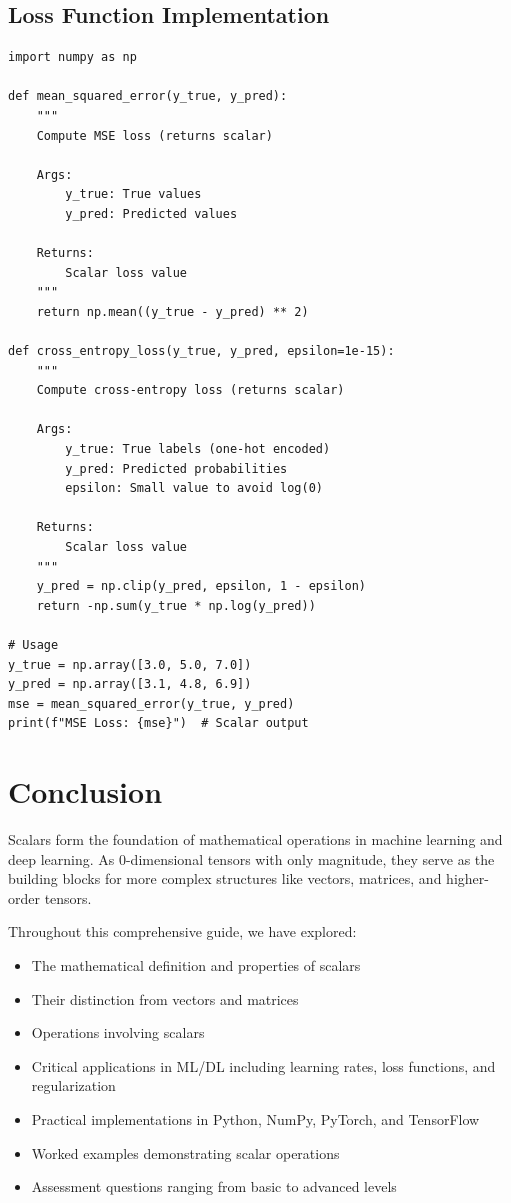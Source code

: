 \documentclass[11pt,a4paper]{article}
\begin{document}
\subsection{Loss Function Implementation}

\begin{lstlisting}
import numpy as np

def mean_squared_error(y_true, y_pred):
    """
    Compute MSE loss (returns scalar)
    
    Args:
        y_true: True values
        y_pred: Predicted values
    
    Returns:
        Scalar loss value
    """
    return np.mean((y_true - y_pred) ** 2)

def cross_entropy_loss(y_true, y_pred, epsilon=1e-15):
    """
    Compute cross-entropy loss (returns scalar)
    
    Args:
        y_true: True labels (one-hot encoded)
        y_pred: Predicted probabilities
        epsilon: Small value to avoid log(0)
    
    Returns:
        Scalar loss value
    """
    y_pred = np.clip(y_pred, epsilon, 1 - epsilon)
    return -np.sum(y_true * np.log(y_pred))

# Usage
y_true = np.array([3.0, 5.0, 7.0])
y_pred = np.array([3.1, 4.8, 6.9])
mse = mean_squared_error(y_true, y_pred)
print(f"MSE Loss: {mse}")  # Scalar output
\end{lstlisting}

\section{Conclusion}

Scalars form the foundation of mathematical operations in machine learning and deep learning. As 0-dimensional tensors with only magnitude, they serve as the building blocks for more complex structures like vectors, matrices, and higher-order tensors.

Throughout this comprehensive guide, we have explored:
\begin{itemize}
    \item The mathematical definition and properties of scalars
    \item Their distinction from vectors and matrices
    \item Operations involving scalars
    \item Critical applications in ML/DL including learning rates, loss functions, and regularization
    \item Practical implementations in Python, NumPy, PyTorch, and TensorFlow
    \item Worked examples demonstrating scalar operations
    \item Assessment questions ranging from basic to advanced levels
\end{itemize}
\end{document}
